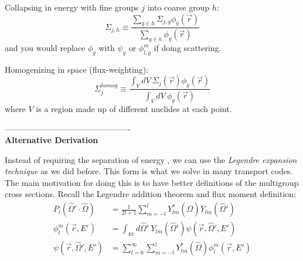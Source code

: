 \documentclass[12pt]{article}
\newcommand{\vOmega}{\ensuremath{\hat{\Omega}}}
\begin{document}
Collapsing in energy with fine groups $j$ into coarse group $h$:
\[
\Sigma_{j,h} \equiv \frac{\sum_{g \in h} \Sigma_{j,g} \phi_g(\vec{r})}{\sum_{g\in h} \phi_g(\vec{r})}
\]
and you would replace $\phi_g$ with $\psi_g$ or $\phi_{l,g}^m$ if doing scattering. 

Homogenizing in space (flux-weighting):
\[
\Sigma_j^{homog} \equiv \frac{\int_V dV \: \Sigma_j(\vec{r}) \phi_g(\vec{r})}{\int_V dV \: 
\phi_g(\vec{r})}
\]
where $V$ is a region made up of different nuclides at each point. 




----------------------------------------------\\
\textbf{Alternative Derivation} 

Instead of requiring the separation of energy , we can use the \textit{Legendre expansion technique} as we did before. This form is what we solve in many transport codes.\\
The main motivation for doing this is to have better definitions of the multigroup cross sections. Recall the Legendre addition theorem and flux moment definition:
\begin{align*}
P_l(\vOmega' \cdot \vOmega) &= \frac{1}{2l+1}\sum_{m=-l}^l Y^*_{lm}(\vOmega)Y_{lm}(\vOmega')\\
\phi_{l}^{m}(\vec{r},E') &= \int_{4 \pi} d\vOmega'\: Y_{lm}(\vOmega') \psi(\vec{r}, \vOmega', E') \\
\psi(\vec{r}, \vOmega', E') &= \sum_{l=0}^{\infty} \sum_{m=-l}^l Y^*_{lm}(\vOmega)\phi_{l}^{m}(\vec{r},E')
\end{align*}
\end{document}

